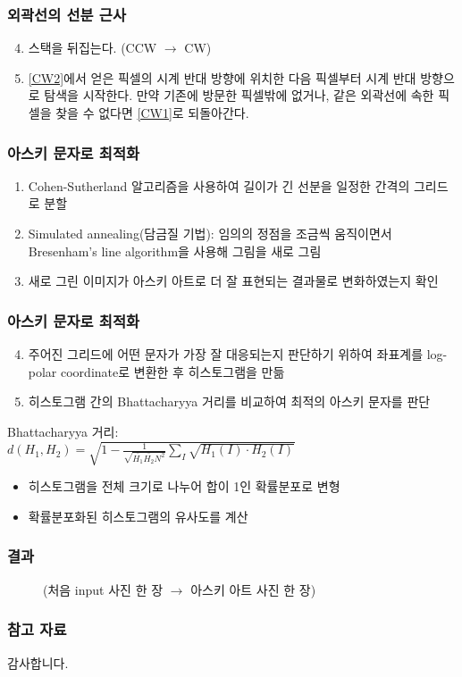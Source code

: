 \documentclass{beamer}
\begin{document}
	\begin{frame}{}
		\frametitle{외곽선의 선분 근사}
		\begin{enumerate}
			\setcounter{enumi}{3}
			\item 스택을 뒤집는다. (CCW $ \rightarrow $ CW)
			\item \ref{CW2}에서 얻은 픽셀의 시계 반대 방향에 위치한 다음 픽셀부터 시계 반대 방향으로 탐색을 시작한다.
			만약 기존에 방문한 픽셀밖에 없거나, 같은 외곽선에 속한 픽셀을 찾을 수 없다면 \ref{CW1}로 되돌아간다.
		\end{enumerate}
	\end{frame}
	\begin{frame}{}
		\frametitle{아스키 문자로 최적화}
		\begin{enumerate}
			\item Cohen-Sutherland 알고리즘을 사용하여 길이가 긴 선분을 일정한 간격의 그리드로 분할\cite{cohen-sutherland}
			\item Simulated annealing(담금질 기법): 임의의 정점을 조금씩 움직이면서 Bresenham's line algorithm을 사용해 그림을 새로 그림\cite{bresenham-line}
			\item 새로 그린 이미지가 아스키 아트로 더 잘 표현되는 결과물로 변화하였는지 확인
		\end{enumerate}	
	\end{frame}
	\begin{frame}{}
		\frametitle{아스키 문자로 최적화}
		\begin{enumerate}
			\setcounter{enumi}{3}
			\item 주어진 그리드에 어떤 문자가 가장 잘 대응되는지 판단하기 위하여 좌표계를 log-polar coordinate로 변환한 후 히스토그램을 만듦\cite{log-polar}
			\item 히스토그램 간의 Bhattacharyya 거리를 비교하여 최적의 아스키 문자를 판단\cite{bhattacharyya}
		\end{enumerate}
		\vspace{1em}
		Bhattacharyya 거리: \\
		\vspace{0.5em}
		\centering
		$ \displaystyle d(H_1,H_2) = \sqrt{1 - \frac{1}{\sqrt{\bar{H_1} \bar{H_2} N^2}} \sum_I \sqrt{H_1(I) \cdot H_2(I)}} $
		\vspace{0.5em}
		\begin{itemize}
			\item 히스토그램을 전체 크기로 나누어 합이 1인 확률분포로 변형
			\item 확률분포화된 히스토그램의 유사도를 계산
		\end{itemize}
	\end{frame}

	\begin{frame}{}
		\frametitle{결과}
		\begin{figure}
			\centering
			(처음 input 사진 한 장 $ \rightarrow $ 아스키 아트 사진 한 장)
		\end{figure}
	\end{frame}
	\begin{frame}{}
		\frametitle{참고 자료}
		
		\tiny{}
	\end{frame}
	\begin{frame}
		\centering
		감사합니다.
	\end{frame}
\end{document}
